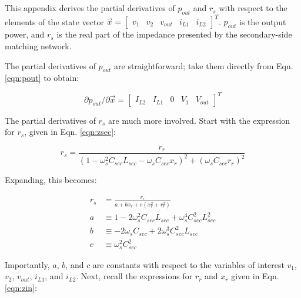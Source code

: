 \documentclass[conference, twocolumn, letterpaper]{IEEEtran}
\begin{document}
\appendices
\section{}
\label{app:partials}

This appendix derives the partial derivatives of $p_{out}$ and $r_s$ with respect to the elements of the state vector $\vec{x} = \begin{bmatrix} v_1 & v_2 & v_{out} & i_{L1} & i_{L2} \end{bmatrix}^T$. $p_{out}$ is the output power, and $r_s$ is the real part of the impedance presented by the secondary-side matching network. 

The partial derivatives of $p_{out}$ are straightforward; take them directly from Eqn. \ref{eqn:pout} to obtain: 

\vspace{-0.2cm}
\begin{equation}
\partial p_{out} / \partial \vec{x} = \begin{bmatrix} I_{L2} & I_{L1} &  0 & V_1 & V_{out} \end{bmatrix}^T
\end{equation}

The partial derivatives of $r_s$ are much more involved. Start with the expression for $r_s$, given in Eqn. \ref{eqn:zsec}:

\vspace{-0.4cm}
\begin{equation}
\label{eqn:r_s_1}
r_s = \frac{r_r}
			{(1-\omega_s^2C_{sec}L_{sec} - \omega_sC_{sec}x_r)^2 + (\omega_sC_{sec}r_r)^2}
\end{equation}

Expanding, this becomes:

\vspace{-0.2cm}
\begin{subequations}
\begin{align}
r_s & = \frac{r_r}{a + bx_r + c(x_r^2 + r_r^2)} \\[2ex]
a &\equiv 1 - 2\omega_s^2C_{sec}L_{sec} + \omega_s^4C_{sec}^2L_{sec}^2 \\
b &\equiv -2\omega_sC_{sec} + 2\omega_s^3C_{sec}^2L_{sec} \\
c &\equiv \omega_s^2C_{sec}^2
\end{align}
\end{subequations}

Importantly, $a$, $b$, and $c$ are constants with respect to the variables of interest $v_1$, $v_2$, $v_{out}$, $i_{L1}$, and $i_{L2}$. Next, recall the expressions for $r_r$ and $x_r$ given in Eqn. \ref{eqn:zin}:
\end{document}
